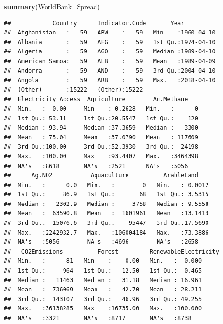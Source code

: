 \documentclass[12pt,]{article}
\newenvironment{Shaded}{\begin{snugshade}}{\end{snugshade}}
\newcommand{\KeywordTok}[1]{\textcolor[rgb]{0.13,0.29,0.53}{\textbf{#1}}}
\newcommand{\OperatorTok}[1]{\textcolor[rgb]{0.81,0.36,0.00}{\textbf{#1}}}
\newcommand{\NormalTok}[1]{#1}
\begin{document}
\begin{Shaded}
\begin{Highlighting}[]
\KeywordTok{summary}\NormalTok{(WorldBank_Spread)}
\end{Highlighting}
\end{Shaded}

\begin{verbatim}
##            Country      Indicator.Code       Year           
##  Afghanistan   :   59   ABW    :   59   Min.   :1960-04-10  
##  Albania       :   59   AFG    :   59   1st Qu.:1974-04-10  
##  Algeria       :   59   AGO    :   59   Median :1989-04-10  
##  American Samoa:   59   ALB    :   59   Mean   :1989-04-09  
##  Andorra       :   59   AND    :   59   3rd Qu.:2004-04-10  
##  Angola        :   59   ARB    :   59   Max.   :2018-04-10  
##  (Other)       :15222   (Other):15222                       
##  Electricity Access  Agriculture        Ag.Methane     
##  Min.   :  0.00     Min.   : 0.2628   Min.   :      0  
##  1st Qu.: 53.11     1st Qu.:20.5547   1st Qu.:    120  
##  Median : 93.94     Median :37.3659   Median :   3300  
##  Mean   : 75.04     Mean   :37.0790   Mean   : 117609  
##  3rd Qu.:100.00     3rd Qu.:52.3930   3rd Qu.:  24198  
##  Max.   :100.00     Max.   :93.4407   Max.   :3464398  
##  NA's   :8618       NA's   :2521      NA's   :5056     
##      Ag.NO2           Aquaculture          ArableLand     
##  Min.   :      0.0   Min.   :        0   Min.   : 0.0012  
##  1st Qu.:     86.9   1st Qu.:       68   1st Qu.: 3.5315  
##  Median :   2302.9   Median :     3758   Median : 9.5558  
##  Mean   :  63590.8   Mean   :  1601961   Mean   :13.1413  
##  3rd Qu.:  15076.6   3rd Qu.:    95447   3rd Qu.:17.5690  
##  Max.   :2242932.7   Max.   :106004184   Max.   :73.3886  
##  NA's   :5056        NA's   :4696        NA's   :2658     
##   CO2Emissions          Forest         RenewableElectricity
##  Min.   :     -81   Min.   :    0.00   Min.   :  0.000     
##  1st Qu.:     964   1st Qu.:   12.50   1st Qu.:  0.465     
##  Median :   11463   Median :   31.18   Median : 16.961     
##  Mean   :  736069   Mean   :   42.70   Mean   : 28.211     
##  3rd Qu.:  143107   3rd Qu.:   46.96   3rd Qu.: 49.255     
##  Max.   :36138285   Max.   :16735.00   Max.   :100.000     
##  NA's   :3321       NA's   :8717       NA's   :8738
\end{verbatim}

\begin{Shaded}
\end{Shaded}
\end{document}

